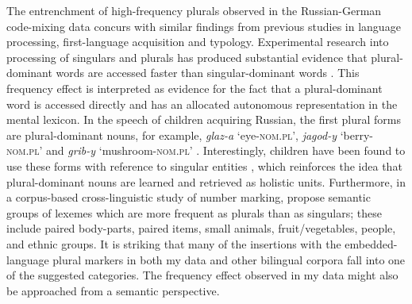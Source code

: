 \begin{sloppypar}
The entrenchment of high-frequency plurals observed in the Russian-German code-mixing data concurs with similar findings from previous studies in language processing, first-language acquisition and typology. Experimental research into processing of singulars and plurals has produced substantial evidence that plural-dominant words are accessed faster than singular-dominant words \citep{new-etal-2004,sereno-jongman-1997,baayen-dijkstra-schreuder}. This frequency effect is interpreted as evidence for the fact that a plural-dominant word is accessed directly and has an allocated autonomous representation in the mental lexicon. In the speech of children acquiring Russian, the first plural forms are plural-dominant nouns, for example, \textit{glaz-a} `eye-\textsc{nom.pl}', \textit{jagod-y} `berry-\textsc{nom.pl}' and \textit{grib-y} `mushroom-\textsc{nom.pl}' \citep[198]{gagarina-voeikova}. Interestingly, children have been found to use these forms with reference to singular entities \citep[91]{ceitlin}, which reinforces the idea that plural-dominant nouns are learned and retrieved as holistic units. Furthermore, in a corpus-based cross-linguistic study of number marking, \citet{haspelmath-karjus} propose semantic groups of lexemes which are more frequent as plurals than as singulars; these include paired body-parts, paired items, small animals, fruit/vegetables, people, and ethnic groups. It is striking that many of the insertions with the embedded-language plural markers in both my data and other bilingual corpora fall into one of the suggested categories. The frequency effect observed in my data might also be approached from a semantic perspective.
\end{sloppypar}

